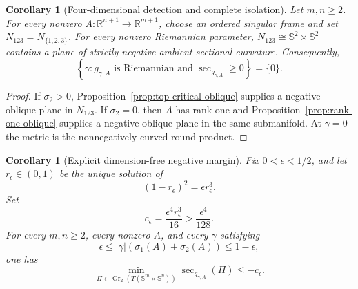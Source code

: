 \documentclass[11pt]{amsart}
\newtheorem{corollary}[theorem]{Corollary}
\theoremstyle{definition}
\theoremstyle{remark}
\DeclareMathOperator{\secop}{sec}
\newcommand{\R}{\mathbb R}
\newcommand{\Sph}{\mathbb S}
\begin{document}
\begin{corollary}[Four-dimensional detection and complete isolation]
\label{cor:complete-isolation}
Let $m,n\geq2$.  For every nonzero
$A:\R^{n+1}\to\R^{m+1}$, choose an ordered singular frame and set
$N_{123}=N_{\{1,2,3\}}$.  For every nonzero Riemannian parameter,
$N_{123}\cong\Sph^2\times\Sph^2$ contains a plane of strictly
negative ambient sectional curvature.  Consequently,
\[
 \left\{\gamma:
  g_{\gamma,A}\text{ is Riemannian and }
  \secop_{g_{\gamma,A}}\geq0
 \right\}=\{0\}.
\]
\end{corollary}

\begin{proof}
If $\sigma_2>0$, Proposition~\ref{prop:top-critical-oblique} supplies
a negative oblique plane in $N_{123}$.  If $\sigma_2=0$, then $A$ has
rank one and Proposition~\ref{prop:rank-one-oblique} supplies a
negative oblique plane in the same submanifold.  At $\gamma=0$ the
metric is the nonnegatively curved round product.
\end{proof}

\begin{corollary}[Explicit dimension-free negative margin]
\label{cor:uniform-negative-margin}
Fix $0<\epsilon<1/2$, and let $r_\epsilon\in(0,1)$ be the unique
solution of
\begin{equation}\label{eq:epsilon-root}
 (1-r_\epsilon)^2=\epsilon r_\epsilon^3.
\end{equation}
Set
\[
 c_\epsilon=\frac{\epsilon^4r_\epsilon^3}{16}
 >\frac{\epsilon^4}{128}.
\]
For every $m,n\geq2$, every nonzero $A$, and every $\gamma$ satisfying
\[
 \epsilon\leq |\gamma|(\sigma_1(A)+\sigma_2(A))
 \leq1-\epsilon,
\]
one has
\[
 \min_{\Pi\in\operatorname{Gr}_2(T(\Sph^m\times\Sph^n))}
 \secop_{g_{\gamma,A}}(\Pi)\leq-c_\epsilon.
\]
\end{corollary}
\end{document}
